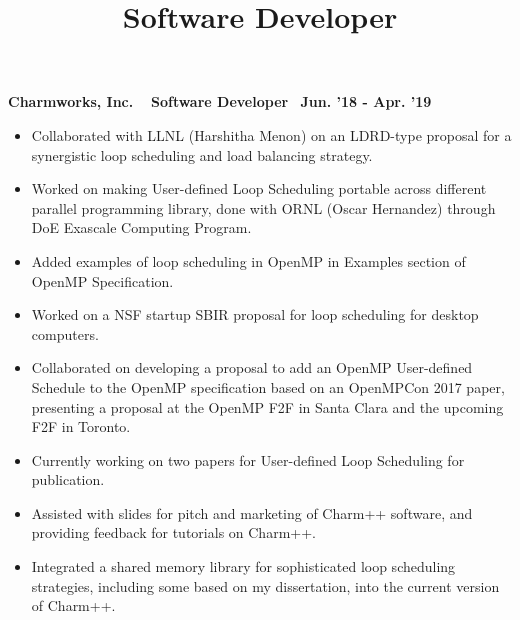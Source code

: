\title{Software Developer}
\textbf{Charmworks, Inc. $\>$$\>$$\>$$\>$Software Developer$\>$$\>$$\>$$\>$Jun. '18 - Apr. '19}
\vspace{0.0in}
\begin{itemize}
\item Collaborated with LLNL (Harshitha Menon) on an LDRD-type proposal for a synergistic loop scheduling and load balancing strategy. 
\item Worked on making User-defined Loop Scheduling portable across different parallel programming library, done with ORNL (Oscar Hernandez) through DoE Exascale Computing Program.
\item Added examples of loop scheduling in OpenMP in Examples section of OpenMP Specification.
\item Worked on a NSF startup SBIR proposal for loop scheduling for desktop computers. 
\item Collaborated on developing a proposal to add an OpenMP User-defined Schedule to the OpenMP specification based on an OpenMPCon 2017 paper, presenting a proposal at the OpenMP F2F in Santa Clara and the upcoming F2F in Toronto.
\item Currently working on two papers for User-defined Loop Scheduling for publication.
\item Assisted with slides for pitch and marketing of Charm++ software, and providing feedback for tutorials on Charm++.
\item Integrated a shared memory library for sophisticated loop scheduling strategies, including some based on my dissertation, into the current version of Charm++.
\end{itemize}


